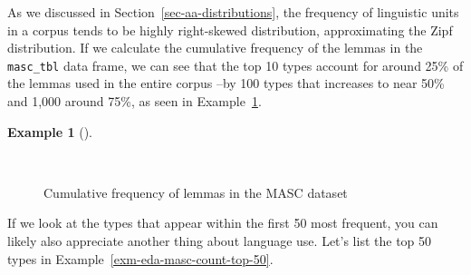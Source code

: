 \documentclass[
  letterpaper,
  DIV=11,
  numbers=noendperiod]{scrreprt}
\theoremstyle{definition}
\newtheorem{example}{Example}[chapter]
\theoremstyle{remark}
\begin{document}
As we discussed in Section~\ref{sec-aa-distributions}, the frequency of
linguistic units in a corpus tends to be highly right-skewed
distribution, approximating the Zipf distribution. If we calculate the
cumulative frequency of the lemmas in the \texttt{masc\_tbl} data frame,
we can see that the top 10 types account for around 25\% of the lemmas
used in the entire corpus --by 100 types that increases to near 50\% and
1,000 around 75\%, as seen in
Example~\ref{exm-eda-masc-count-cumulative}.

\begin{example}[]\protect\hypertarget{exm-eda-masc-count-cumulative}{}\label{exm-eda-masc-count-cumulative}

~

\begin{figure}[H]


\caption{\label{fig-eda-masc-count-cumulative}Cumulative frequency of
lemmas in the MASC dataset}

\end{figure}%

\end{example}

If we look at the types that appear within the first 50 most frequent,
you can likely also appreciate another thing about language use. Let's
list the top 50 types in Example~\ref{exm-eda-masc-count-top-50}.
\end{document}
